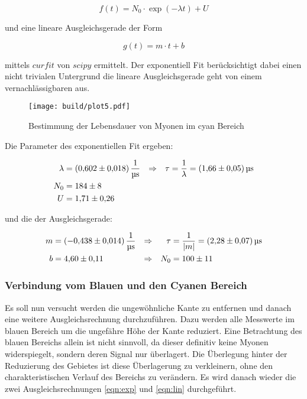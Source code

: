 \begin{equation}
	f(t)=N_0 \cdot \exp(-\lambda t) + U
	\label{eqn:exp}
\end{equation}

und eine lineare Ausgleichsgerade der Form

\begin{equation}
	g(t)=m \cdot t +b
	\label{eqn:lin}
\end{equation}

mittels $curfit$ von $scipy$ ermittelt. 
Der exponentiell Fit berücksichtigt dabei einen nicht trivialen Untergrund die lineare Ausgleichsgerade geht von einem vernachlässigbaren aus. 

\begin{figure}[H]
	\centering
	\texttt{[image: build/plot5.pdf]}
	\caption{Bestimmung der Lebensdauer von Myonen im cyan Bereich}\label{fig:plt5}
\end{figure}

Die Parameter des exponentiellen Fit ergeben:

\begin{align}
	\lambda&=\qty{0.602(0.018)}{\per\us} &\Rightarrow & & \tau&=\frac{1}{\lambda }=\qty{1.66(0.05)}{\us} \\
	N_0&=\num{184(8)} \notag \\
	U&=\num{1.71(0.26)} \notag
\end{align}

und die der Ausgleichsgerade: 

\begin{align}
	m&=\qty{-0.438(0.014)}{\per\us} &\Rightarrow & & \tau&=\frac{1}{|m|}=\qty{2.28(0.07)}{\us} \\
	b&=\num{4.60(0.11)} &\Rightarrow & & N_0&=\num{100(11)} \notag
\end{align}

\subsubsection{Verbindung vom Blauen und den Cyanen Bereich}
Es soll nun versucht werden die ungewöhnliche Kante zu entfernen und danach eine weitere Ausgleichsrechnung durchzuführen. 
Dazu werden alle Messwerte im blauen Bereich um die ungefähre Höhe der Kante reduziert. 
Eine Betrachtung des blauen Bereichs allein ist nicht sinnvoll, da dieser definitiv keine Myonen widerspiegelt, sondern deren Signal nur überlagert. 
Die Überlegung hinter der Reduzierung des Gebietes ist diese Überlagerung zu verkleinern, ohne den charakteristischen Verlauf des Bereichs zu verändern. 
Es wird danach wieder die zwei Ausgleichsrechnungen \eqref{eqn:exp} und \eqref{eqn:lin} durchgeführt. 

